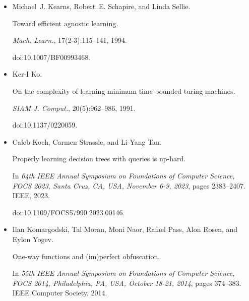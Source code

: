 \documentclass[10pt,a4paper]{article}
\begin{document}
\begin{itemize}
Valentine Kabanets and Jin-yi Cai.


Circuit minimization problem.


In F. Frances Yao and Eugene M. Luks, editors, \emph{Proceedings of
the Thirty-Second Annual ACM Symposium on Theory of Computing, May 21-23,
2000, Portland, OR, USA}, pages 73–79. ACM, 2000.


doi:10.1145/335305.335314.





\item[] 
[30]

Michael J. Kearns, Robert E. Schapire, and Linda Sellie.


Toward efficient agnostic learning.


\emph{Mach. Learn.}, 17(2-3):115–141, 1994.


doi:10.1007/BF00993468.





\item[] 
[31]

Ker-I Ko.


On the complexity of learning minimum time-bounded turing machines.


\emph{SIAM J. Comput.}, 20(5):962–986, 1991.


doi:10.1137/0220059.





\item[] 
[32]

Caleb Koch, Carmen Strassle, and Li-Yang Tan.


Properly learning decision trees with queries is np-hard.


In \emph{64th IEEE Annual Symposium on Foundations of Computer
Science, FOCS 2023, Santa Cruz, CA, USA, November 6-9, 2023}, pages
2383–2407. IEEE, 2023.


doi:10.1109/FOCS57990.2023.00146.





\item[] 
[33]

Ilan Komargodski, Tal Moran, Moni Naor, Rafael Pass, Alon Rosen, and Eylon
Yogev.


One-way functions and (im)perfect obfuscation.


In \emph{55th IEEE Annual Symposium on Foundations of Computer
Science, FOCS 2014, Philadelphia, PA, USA, October 18-21, 2014}, pages
374–383. IEEE Computer Society, 2014.



\end{itemize}
\end{document}
